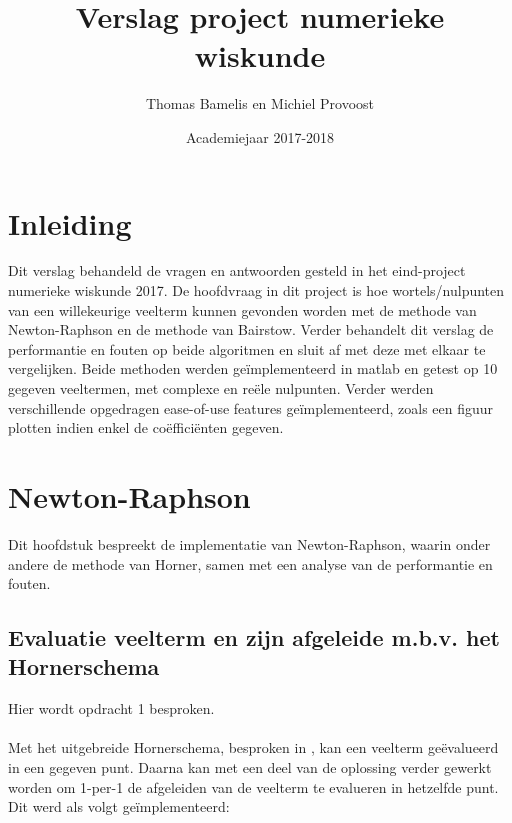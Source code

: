 \documentclass[a4paper,kulak]{kulakarticle}
\date{Academiejaar 2017-2018}
\title{Verslag project numerieke wiskunde}
\author{Thomas Bamelis en Michiel Provoost}
\begin{document}
\maketitle

\section*{Inleiding}

Dit verslag behandeld de vragen en antwoorden gesteld in het eind-project numerieke wiskunde 2017. De hoofdvraag in dit project is hoe wortels/nulpunten van een willekeurige veelterm kunnen gevonden worden met de methode van Newton-Raphson en de methode van Bairstow. Verder behandelt dit verslag de performantie en fouten op beide algoritmen en  sluit af met deze met elkaar te vergelijken. Beide methoden werden geïmplementeerd in matlab en getest op 10 gegeven veeltermen, met complexe en reële nulpunten. 
Verder werden verschillende opgedragen ease-of-use features geïmplementeerd, zoals een figuur plotten indien enkel de coëfficiënten gegeven.

\section{Newton-Raphson}
Dit hoofdstuk bespreekt de implementatie van Newton-Raphson, waarin onder andere de methode van Horner, samen met een analyse van de performantie en fouten.

\subsection{Evaluatie veelterm en zijn afgeleide m.b.v. het Hornerschema}
Hier wordt opdracht 1 besproken. \\~\\
Met het uitgebreide Hornerschema, besproken in \cite{bultheel2006inleiding}, kan een veelterm geëvalueerd in een gegeven punt. Daarna kan met een deel van de oplossing verder gewerkt worden om 1-per-1 de afgeleiden van de veelterm te evalueren in hetzelfde punt.\\
Dit werd als volgt geïmplementeerd:\\


\end{document}
